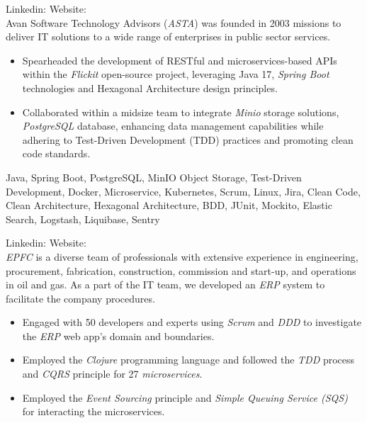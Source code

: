 \begin{experiences}
{
  Linkedin: 
  Website: \\
  Avan Software Technology Advisors (\emph{ASTA}) was founded in 2003 missions to deliver IT solutions to a wide range of enterprises in public sector services.
  \begin{itemize}
    \item Spearheaded the development of RESTful and microservices-based APIs within the \emph{Flickit} open-source project, leveraging Java 17, \emph{Spring Boot} technologies and Hexagonal Architecture design principles.
    \item Collaborated within a midsize team to integrate \emph{Minio} storage solutions, \emph{PostgreSQL} database, enhancing data management capabilities while adhering to Test-Driven Development (TDD) practices and promoting clean code standards. \end{itemize}}
  {Java, Spring Boot, PostgreSQL, MinIO Object Storage, Test-Driven Development, Docker, Microservice, Kubernetes, Scrum, Linux, Jira, Clean Code, Clean Architecture, Hexagonal Architecture, BDD, JUnit, Mockito, Elastic Search, Logstash, Liquibase, Sentry} 
 \emptySeparator
 {
   Linkedin: 
   Website: \\
   \emph{EPFC} is a diverse team of professionals with extensive experience in engineering, procurement, fabrication, construction, commission and start-up, and operations in oil and gas. As a part of the IT team, we developed an \emph{ERP} system to facilitate the company procedures.
   \begin{itemize}
   \item Engaged with 50 developers and experts using \emph{Scrum} and \emph{DDD} to investigate the \textit{ERP} web app's domain and boundaries.
   \item Employed the \emph{Clojure} programming language and followed the \emph{TDD} process and \textit{CQRS} principle for 27 \emph{microservices}.
   \item Employed the \textit{Event Sourcing} principle and \textit{Simple Queuing Service (SQS)} for interacting the microservices.

\end{itemize}}
\end{experiences}
